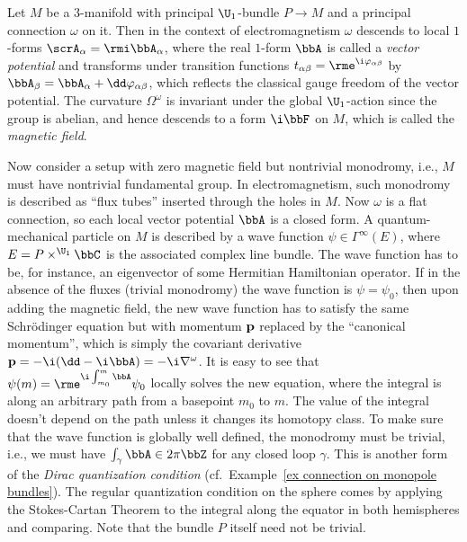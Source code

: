 \begin{example}
    Let $M$ be a $3$-manifold with principal $\U_1$-bundle $P\to M$ and a principal connection $\omega$ on it. Then in the context of electromagnetism $\omega$ descends to local $1$-forms $\scrA_\alpha=\rmi \bbA_\alpha$, where the real $1$-form $\bbA$ is called a \emph{vector potential} and transforms under transition functions $t_{\alpha\beta}=\rme^{\i\varphi_{\alpha\beta}}$ by $\bbA_\beta=\bbA_\alpha+\dd \varphi_{\alpha\beta}$, which reflects the classical gauge freedom of the vector potential. The curvature $\Omega^\omega$ is invariant under the global $\U_1$-action since the group is abelian, and hence descends to a form $\i \bbF$ on $M$, which is called the \emph{magnetic field}. 
    
    Now consider a setup with zero magnetic field but nontrivial monodromy, i.e., $M$ must have nontrivial fundamental group. In electromagnetism, such monodromy is described as ``flux tubes'' inserted through the holes in $M$. Now $\omega$ is a flat connection, so each local vector potential $\bbA$ is a closed form. A quantum-mechanical particle on $M$ is described by a wave function $\psi\in \Gamma^\infty(E)$, where $E=P\times^{\U_1}\bbC$ is the associated complex line bundle. The wave function has to be, for instance, an eigenvector of some Hermitian Hamiltonian operator. If in the absence of the fluxes (trivial monodromy) the wave function is $\psi=\psi_0$, then upon adding the magnetic field, the new wave function has to satisfy the same Schr\"odinger equation but with momentum $\bf{p}$ replaced by the ``canonical momentum'', which is simply the covariant derivative $\bf{p}=-\i (\dd-\i \bbA)=-\i\nabla^\omega$. It is easy to see that $\psi(m)=\rme^{\i \int_{m_0}^m \bbA }\psi_0$ locally solves the new equation, where the integral is along an arbitrary path from a basepoint $m_0$ to $m$. The value of the integral doesn't depend on the path unless it changes its homotopy class. To make sure that the wave function is globally well defined, the monodromy must be trivial, i.e., we must have $\int_\gamma \bbA\in 2\pi\bbZ$ for any closed loop $\gamma$. This is another form of the \emph{Dirac quantization condition} (cf.\ Example~\ref{ex connection on monopole bundles}). The regular quantization condition on the sphere comes by applying the Stokes-Cartan Theorem to the integral along the equator in both hemispheres and comparing. Note that the bundle $P$ itself need not be trivial. 


\end{example}
